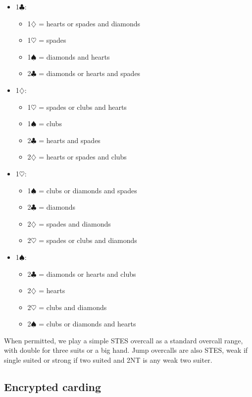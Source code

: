 \documentclass[a4paper,14pt]{extarticle}
\begin{document}
\begin{itemize}
\item 1$\clubsuit$:
	\begin{itemize}
	\item 1$\diamondsuit$ = hearts or spades and diamonds
	\item 1$\heartsuit$ = spades
	\item 1$\spadesuit$ = diamonds and hearts
	\item 2$\clubsuit$ = diamonds or hearts and spades
	\end{itemize}
\item 1$\diamondsuit$:
	\begin{itemize}
	\item 1$\heartsuit$ = spades or clubs and hearts
	\item 1$\spadesuit$ = clubs
	\item 2$\clubsuit$ = hearts and spades
	\item 2$\diamondsuit$ = hearts or spades and clubs
	\end{itemize}
\item 1$\heartsuit$:
	\begin{itemize}
	\item 1$\spadesuit$ = clubs or diamonds and spades
	\item 2$\clubsuit$ = diamonds
	\item 2$\diamondsuit$ = spades and diamonds
	\item 2$\heartsuit$ = spades or clubs and diamonds
	\end{itemize}

\newpage

\item 1$\spadesuit$:
	\begin{itemize}
	\item 2$\clubsuit$ = diamonds or hearts and clubs
	\item 2$\diamondsuit$ = hearts
	\item 2$\heartsuit$ = clubs and diamonds
	\item 2$\spadesuit$ = clubs or diamonds and hearts
	\end{itemize}
\end{itemize}

When permitted, we play a simple STES overcall as a standard overcall range,
with double for three suits or a big hand. Jump overcalls are also STES, weak
if single suited or strong if two suited and 2NT is any weak two suiter.

\subsection{Encrypted carding}
\label{sec:carding:encrypted}
\end{document}
